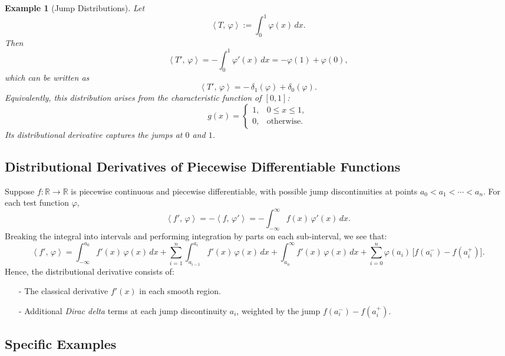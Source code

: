 \documentclass[11pt,openany]{book}
\newcommand{\dist}[2]{\left\langle #1,\, #2 \right\rangle}
\newtheorem{example}{Example}[section]
\begin{document}
\begin{example}[Jump Distributions]
Let
\[
\dist{T}{\varphi} := \int_0^1 \varphi(x)\,dx.
\]
Then
\[
\dist{T'}{\varphi} = -\int_0^1 \varphi'(x)\,dx
= -\varphi(1) + \varphi(0),
\]
which can be written as
\[
\dist{T'}{\varphi} = -\,\delta_1(\varphi) + \delta_0(\varphi).
\]
Equivalently, this distribution arises from the characteristic function of $[0,1]$:
\[
g(x) =
\begin{cases}
1, & 0 \le x \le 1, \\
0, & \text{otherwise}.
\end{cases}
\]
Its distributional derivative captures the jumps at $0$ and $1$.
\end{example}

\subsection{Distributional Derivatives of Piecewise Differentiable Functions}

\noindent
Suppose $f: \mathbb{R} \to \mathbb{R}$ is piecewise continuous and piecewise differentiable, with possible jump discontinuities at points $a_0 < a_1 < \cdots < a_n$. For each test function $\varphi$,
\[
\dist{f'}{\varphi}
= -\dist{f}{\varphi'}
= -\int_{-\infty}^{\infty} f(x)\,\varphi'(x)\,dx.
\]
Breaking the integral into intervals and performing integration by parts on each sub-interval, we see that:
\[
\dist{f'}{\varphi}
= \int_{-\infty}^{a_0} f'(x)\,\varphi(x)\,dx + \sum_{i=1}^{n} \int_{a_{i-1}}^{a_i} f'(x)\,\varphi(x)\,dx + \int_{a_n}^{\infty} f'(x)\,\varphi(x)\,dx
+ \sum_{i=0}^{n} \varphi(a_i)\,\bigl[f(a_i^-) - f(a_i^+)\bigr].
\]
Hence, the distributional derivative consists of:
\begin{itemize}
    \item[-] The classical derivative $f'(x)$ in each smooth region.
    \item[-] Additional \emph{Dirac delta} terms at each jump discontinuity $a_i$, weighted by the jump $f(a_i^-)-f(a_i^+)$.
\end{itemize}

\subsection{Specific Examples}
\end{document}
